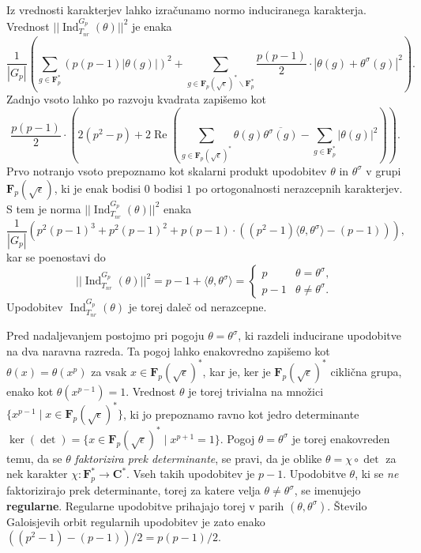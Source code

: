 \documentclass[11pt]{book}
\def\CC{\mathbf{C}}
\def\FF{\mathbf{F}}
\DeclareMathOperator\Ind{Ind}
\DeclareMathOperator\Realpart{Re}
\def\definicija{\color{rdeca}\bf}
\theoremstyle{definition}
\theoremstyle{zgled}
\theoremstyle{zgledbrezstevilke}
\theoremstyle{odprtproblem}
\theoremstyle{domacanaloga}
\theoremstyle{izrek}
\begin{document}
Iz vrednosti karakterjev lahko izračunamo normo induciranega karakterja. Vrednost $|| \Ind_{T_{nr}}^{G_p}(\theta) ||^2$ je enaka
\[
    \frac{1}{|G_p|} \left(  \sum_{g \in \FF_p^*} (p (p-1) |\theta(g)|)^2 + \sum_{g \in \FF_p(\sqrt{\epsilon})^* \backslash \FF_p^*} \frac{p(p-1)}{2} \cdot |\theta(g) + \theta^{\sigma}(g)|^2 \right).
\]
Zadnjo vsoto lahko po razvoju kvadrata zapišemo kot
\[
    \frac{p(p-1)}{2} \cdot \left( 2 (p^2  - p) + 2 \Realpart \left( \sum_{g \in \FF_p(\sqrt{\epsilon})^*} \theta(g) \overline{\theta^{\sigma}(g)} - \sum_{g \in \FF_p^*}  |\theta(g)|^2 \right) \right).
\]
Prvo notranjo vsoto prepoznamo kot skalarni produkt upodobitev $\theta$ in $\theta^{\sigma}$ v grupi $\FF_p(\sqrt{\epsilon})$, ki je enak bodisi $0$ bodisi $1$ po ortogonalnosti nerazcepnih karakterjev. S tem je norma $|| \Ind_{T_{nr}}^{G_p}(\theta) ||^2$ enaka
\[
    \frac{1}{|G_p|} \left( p^2(p-1)^3 + p^2(p-1)^2 + p(p-1) \cdot \left(  (p^2 - 1) \langle \theta, \theta^{\sigma} \rangle - (p-1) \right) \right),
\]
kar se poenostavi do
\[
    || {\textstyle \Ind_{T_{nr}}^{G_p}(\theta)} ||^2 = p-1 + \langle \theta, \theta^{\sigma} \rangle = \begin{cases}
        p & \theta = \theta^\sigma, \\
        p-1 & \theta \neq \theta^{\sigma}.
    \end{cases}
\]
Upodobitev $\Ind_{T_{nr}}^{G_p}(\theta)$ je torej daleč od nerazcepne.

Pred nadaljevanjem postojmo pri pogoju $\theta = \theta^{\sigma}$, ki razdeli inducirane upodobitve na dva naravna razreda. Ta pogoj lahko enakovredno zapišemo kot $\theta(x) = \theta(x^{p})$ za vsak $x \in \FF_p(\sqrt{\epsilon})^*$, kar je, ker je $\FF_p(\sqrt{\epsilon})^*$ ciklična grupa, enako kot $\theta(x^{p-1}) = 1$. Vrednost $\theta$ je torej trivialna na množici $\{ x^{p-1} \mid x \in \FF_p(\sqrt{\epsilon})^* \}$, ki jo prepoznamo ravno kot jedro determinante $\ker(\det) = \{ x \in \FF_p(\sqrt{\epsilon})^* \mid x^{p+1} = 1 \}$. Pogoj $\theta = \theta^{\sigma}$ je torej enakovreden temu, da se $\theta$ \emph{faktorizira prek determinante}, se pravi, da je oblike $\theta = \chi \circ \det$ za nek karakter $\chi \colon \FF_p^* \to \CC^*$. Vseh takih upodobitev je $p-1$. Upodobitve $\theta$, ki se \emph{ne} faktorizirajo prek determinante, torej za katere velja $\theta \neq \theta^{\sigma}$, se imenujejo {\definicija regularne}. Regularne upodobitve prihajajo torej v parih $(\theta, \theta^\sigma)$. Število Galoisjevih orbit regularnih upodobitev je zato enako $((p^2 - 1) - (p-1))/2 = p(p-1)/2$.
\end{document}
